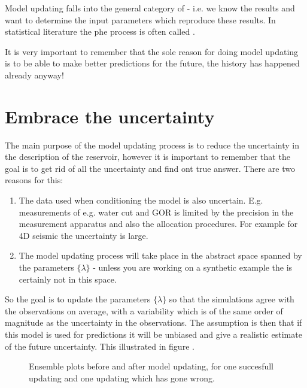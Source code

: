 \documentclass[letterpaper,10pt,english]{sphinxmanual}
\begin{document}
Model updating falls into the general category of  - i.e. we
know the results and want to determine the input parameters which reproduce
these results. In statistical literature the phe process is often called
.

It is very important to remember that the sole reason for doing model updating
is to be able to make better predictions for the future, the history has
happened already anyway!


\section{Embrace the uncertainty}
\label{\detokenize{introduction/index:embrace-the-uncertainty}}
The main purpose of the model updating process is to reduce the uncertainty in
the description of the reservoir, however it is important to remember that the
goal is  to get rid of all the uncertainty and find ont true answer. There
are two reasons for this:
\begin{enumerate}
\item {} 
The data used when conditioning the model is also uncertain. E.g.
measurements of e.g. water cut and GOR is limited by the precision in the
measurement apparatus and also the allocation procedures. For example for 4D
seismic the uncertainty is large.

\item {} 
The model updating process will take place in the abstract space spanned by
the parameters \(\{\lambda\}\) - unless you are working on a synthetic
example the  is certainly not in this space.

\end{enumerate}

So the goal is to update the parameters \(\{\lambda\}\) so that the
simulations agree with the observations on average, with a variability which is
of the same order of magnitude as the uncertainty in the observations. The
assumption is then that if this model is used for predictions it will be
unbiased and give a realistic estimate of the future uncertainty. This
illustrated in figure .

\begin{figure}[htbp]
\centering
\capstart

\noindent{}
\caption{Ensemble plots before and after model updating, for one succesfull updating
and one updating which has gone wrong.}\label{\detokenize{introduction/index:id3}}\end{figure}
\end{document}
